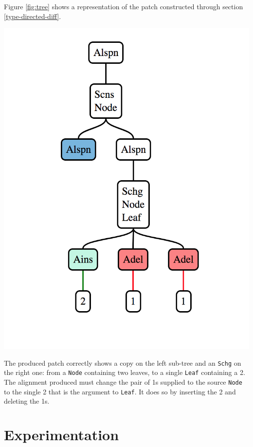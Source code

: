 \documentclass[11pt, titlepage]{article}
\newcommand{\toHaskell}[1]{\texttt{#1}\xspace}
\newcommand{\toClojure}[1]{\texttt{#1}\xspace}
\newcommand{\schg}{\toHaskell{Schg}}
\begin{document}
Figure \ref{fig:tree} shows a representation of the patch constructed through section \ref{type-directed-diff}. 

\vspace{.6em}
\begin{minipage}{\linewidth}
\centering
\includegraphics[scale=0.5]{tree.png}
\label{fig:tree}  
\end{minipage}
\vspace{.6em}

The produced patch correctly shows a copy on the left sub-tree and an \schg on the right one: from a \toClojure{Node} containing two leaves, to a single \toClojure{Leaf} containing a 2. The alignment produced must change the pair of 1s supplied to the source \toClojure{Node} to the single 2 that is the argument to \toClojure{Leaf}. It does so by inserting the 2 and deleting the 1s.

\section{Experimentation}
\end{document}
